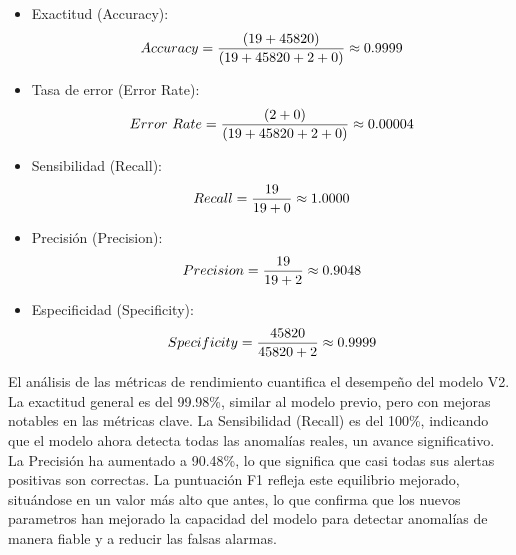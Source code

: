       \begin{itemize}
            \item  Exactitud (Accuracy):
                  \begin{align}
                        Accuracy = \frac{(19+45820)}{(19+45820+2+0)}\approx 0.9999 \notag \\
                        \label{eq:accuracy_optimized}
                  \end{align}
            \item Tasa de error (Error Rate):
                  \begin{align}
                        Error\ Rate = \frac{(2+0)}{(19+45820+2+0)}\approx 0.00004 \notag \\
                        \label{eq:error_rate_optimized}
                  \end{align}
            \item Sensibilidad (Recall):
                  \begin{align}
                        Recall = \frac{19}{19+0}\approx 1.0000 \notag \\
                        \label{eq:recall_optimized}
                  \end{align}
            \item Precisión (Precision): 
                  \begin{align}
                        Precision = \frac{19}{19+2}\approx 0.9048 \notag \\
                        \label{eq:precision_optimized}
                  \end{align}
            \item Especificidad (Specificity): 
                  \begin{align}
                        Specificity = \frac{45820}{45820+2}\approx 0.9999 \notag \\
                        \label{eq:specificity_optimized}
                  \end{align}
      \end{itemize}

      El análisis de las métricas de rendimiento cuantifica el desempeño del modelo V2. La exactitud general es del 99.98\%, similar al modelo previo, pero con mejoras notables en las métricas clave. La Sensibilidad (Recall) es del 100\%, indicando que el modelo ahora detecta todas las anomalías reales, un avance significativo. La Precisión ha aumentado a 90.48\%, lo que significa que casi todas sus alertas positivas son correctas. La puntuación F1 refleja este equilibrio mejorado, situándose en un valor más alto que antes, lo que confirma que los nuevos parametros han mejorado la capacidad del modelo para detectar anomalías de manera fiable y a reducir las falsas alarmas.

